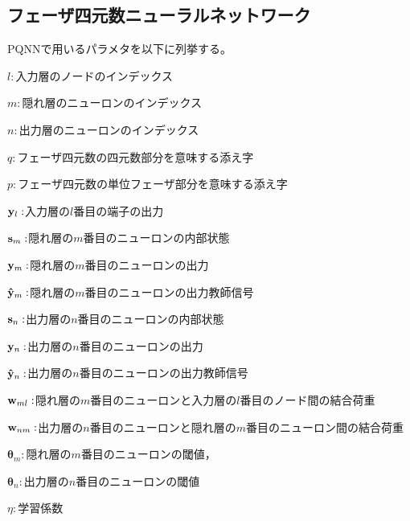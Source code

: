\documentclass[a4j, twocolumn]{jsarticle}
\begin{document}
\subsection{フェーザ四元数ニューラルネットワーク}
PQNNで用いるパラメタを以下に列挙する。

$l:$入力層のノードのインデックス

$m:$隠れ層のニューロンのインデックス

$n:$出力層のニューロンのインデックス

$q:$フェーザ四元数の四元数部分を意味する添え字

$p:$フェーザ四元数の単位フェーザ部分を意味する添え字

${\bf y}_{l}:$入力層の$l$番目の端子の出力

${\bf s}_{m}:$隠れ層の$m$番目のニューロンの内部状態

${\bf y}_{m}:$隠れ層の$m$番目のニューロンの出力

${\bf \hat{y}}_{m}:$隠れ層の$m$番目のニューロンの出力教師信号

${\bf s}_{n}:$出力層の$n$番目のニューロンの内部状態

${\bf y}_{n}:$出力層の$n$番目のニューロンの出力

${\bf \hat{y}}_{n}:$出力層の$n$番目のニューロンの出力教師信号

${\bf w}_{ml}:$隠れ層の$m$番目のニューロンと入力層の$l$番目のノード間の結合荷重

${\bf w}_{nm}:$出力層の$n$番目のニューロンと隠れ層の$m$番目のニューロン間の結合荷重

$\bm{\theta}_{m}:$隠れ層の$m$番目のニューロンの閾値，

$\bm{\theta}_{n}:$出力層の$n$番目のニューロンの閾値

$\eta:$学習係数
\end{document}
